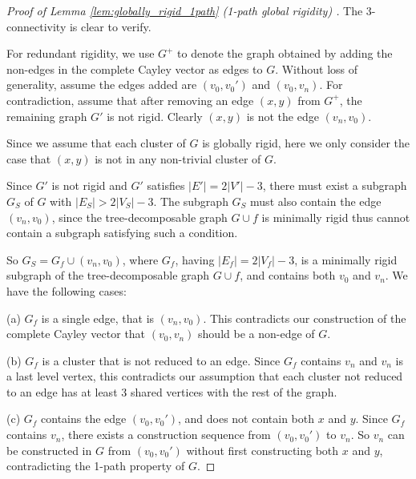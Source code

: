 \documentclass[secthm,amsthm,english]{article}
\theoremstyle{definition}
\theoremstyle{remark}
\begin{document}
\begin{proof}[Proof of Lemma \ref{lem:globally_rigid_1path} (1-path global rigidity) ]
The 3-connectivity is clear to verify.

For redundant rigidity, we use $G^+$ to denote the graph obtained by adding the non-edges
in  the complete Cayley vector as edges to $G$. 
Without loss of generality, assume the edges added are $(v_0,v_0')$ and $(v_0,v_n)$.
For contradiction, assume that after removing an edge $(x,y)$ from $G^+$, 
the remaining graph $G'$ is not rigid. 
Clearly $(x,y)$ is not the edge $(v_n,v_0)$.

Since we assume that each cluster of $G$ is globally rigid, here we only consider the case that
$(x,y)$ is not in any non-trivial cluster of $G$. 

Since $G'$ is not rigid and $G'$ satisfies $|E'|=2|V'|-3$, 
there must exist a subgraph $G_S$ of $G$
with $|E_S|>2|V_S|-3$. 
The subgraph $G_S$ must also contain the edge $(v_n,v_0)$, 
since the tree-decomposable graph $G \cup f$ is minimally rigid thus cannot contain a subgraph satisfying such a condition. 

So $G_S = G_f \cup (v_n,v_0)$, where $G_f$, having $|E_f|=2|V_f|-3$,
is a minimally rigid subgraph of the tree-decomposable graph $G \cup f$, 
and contains both $v_0$ and $v_n$. 
We have the following cases:

\noindent (a) $G_f$ is a single edge, that is $(v_n,v_0)$. 
This contradicts our construction of the complete Cayley vector that $(v_0,v_n)$ should be a non-edge of $G$. 

\noindent (b) $G_f$ is a cluster that is not reduced to an edge.  
Since $G_f$ contains $v_n$ and $v_n$ is a last level vertex, 
this contradicts our assumption that each cluster not reduced to an edge
has at least 3 shared vertices with the rest of the graph.

\noindent (c) $G_f$ contains the edge $(v_0,v_0')$, and does not contain both $x$ and $y$. 
Since $G_f$ contains $v_n$,  there exists a construction sequence from $(v_0,v_0')$ to $v_n$. 
So $v_n$ can be constructed in $G$ from $(v_0,v_0')$ without first constructing both $x$ and $y$, 
contradicting the 1-path property of $G$.
\end{proof}
\end{document}
